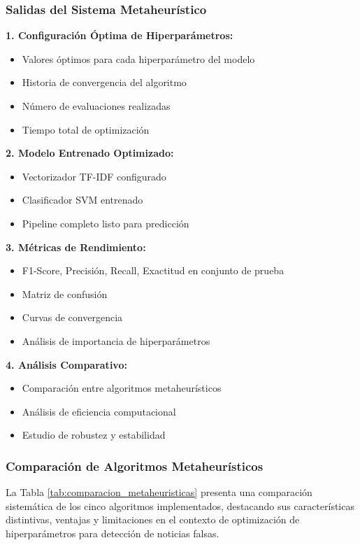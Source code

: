 \subsubsection{Salidas del Sistema Metaheurístico}

\textbf{1. Configuración Óptima de Hiperparámetros:}
\begin{itemize}
    \item Valores óptimos para cada hiperparámetro del modelo
    \item Historia de convergencia del algoritmo
    \item Número de evaluaciones realizadas
    \item Tiempo total de optimización
\end{itemize}

\textbf{2. Modelo Entrenado Optimizado:}
\begin{itemize}
    \item Vectorizador TF-IDF configurado
    \item Clasificador SVM entrenado
    \item Pipeline completo listo para predicción
\end{itemize}

\textbf{3. Métricas de Rendimiento:}
\begin{itemize}
    \item F1-Score, Precisión, Recall, Exactitud en conjunto de prueba
    \item Matriz de confusión
    \item Curvas de convergencia
    \item Análisis de importancia de hiperparámetros
\end{itemize}

\textbf{4. Análisis Comparativo:}
\begin{itemize}
    \item Comparación entre algoritmos metaheurísticos
    \item Análisis de eficiencia computacional
    \item Estudio de robustez y estabilidad
\end{itemize}

\subsubsection{Comparación de Algoritmos Metaheurísticos}

La Tabla \ref{tab:comparacion_metaheuristicas} presenta una comparación sistemática de los cinco algoritmos implementados, destacando sus características distintivas, ventajas y limitaciones en el contexto de optimización de hiperparámetros para detección de noticias falsas.

